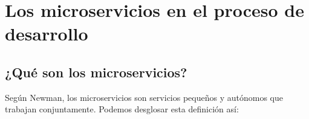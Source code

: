\documentclass[11pt,spanish,listoffigures]{tfgetsinf}
\begin{document}
%

\chapter{Los microservicios en el proceso de desarrollo}

\section{¿Qué son los microservicios?}

Según Newman, \cite{Newman2015a} los microservicios son servicios pequeños y autónomos que trabajan conjuntamente. Podemos desglosar esta definición así:
\end{document}
